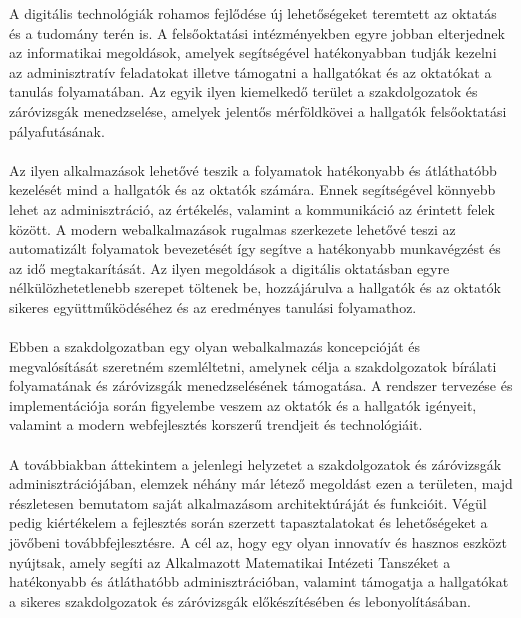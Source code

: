 
A digitális technológiák rohamos fejlődése új lehetőségeket teremtett az oktatás és a tudomány terén is. A felsőoktatási intézményekben egyre jobban elterjednek az informatikai megoldások, amelyek segítségével hatékonyabban tudják kezelni az adminisztratív feladatokat illetve támogatni a hallgatókat és az oktatókat a tanulás folyamatában. Az egyik ilyen kiemelkedő terület a szakdolgozatok és záróvizsgák menedzselése, amelyek jelentős mérföldkövei a hallgatók felsőoktatási pályafutásának.
\\
\\
Az ilyen alkalmazások lehetővé teszik a folyamatok hatékonyabb és átláthatóbb kezelését mind a hallgatók és az oktatók számára. Ennek segítségével könnyebb lehet az adminisztráció, az értékelés, valamint a kommunikáció az érintett felek között. A modern webalkalmazások rugalmas szerkezete lehetővé teszi az automatizált folyamatok bevezetését így segítve a hatékonyabb munkavégzést és az idő megtakarítását. Az ilyen megoldások a digitális oktatásban egyre nélkülözhetetlenebb szerepet töltenek be, hozzájárulva a hallgatók és az oktatók sikeres együttműködéséhez és az eredményes tanulási folyamathoz.
\\
\\
Ebben a szakdolgozatban egy olyan webalkalmazás koncepcióját és megvalósítását szeretném szemléltetni, amelynek célja a szakdolgozatok bírálati folyamatának és záróvizsgák menedzselésének támogatása. A rendszer tervezése és implementációja során figyelembe veszem az oktatók és a hallgatók igényeit, valamint a modern webfejlesztés korszerű trendjeit és technológiáit.
\\
\\
A továbbiakban áttekintem a jelenlegi helyzetet a szakdolgozatok és záróvizsgák adminisztrációjában, elemzek néhány már létező megoldást ezen a területen, majd részletesen bemutatom saját alkalmazásom architektúráját és funkcióit. Végül pedig kiértékelem a fejlesztés során szerzett tapasztalatokat és lehetőségeket a jövőbeni továbbfejlesztésre. A cél az, hogy egy olyan innovatív és hasznos eszközt nyújtsak, amely segíti az Alkalmazott Matematikai Intézeti Tanszéket a hatékonyabb és átláthatóbb adminisztrációban, valamint támogatja a hallgatókat a sikeres szakdolgozatok és záróvizsgák előkészítésében és lebonyolításában.
